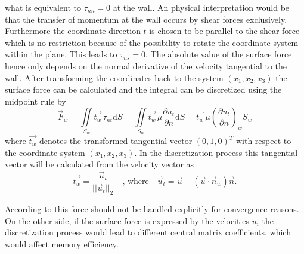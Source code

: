     what is equivalent to \( \tau_{nn} = 0\) at the wall. An physical interpretation would be that the transfer of momentum at the wall occurs by shear forces exclusively. Furthermore the coordinate direction \(t\) is chosen to be parallel to the shear force which is no restriction because of the possibility to rotate the coordinate system within the plane. This leads to \(\tau_{ns} = 0 \). The absolute value of the surface force hence only depends on the normal derivative of the velocity tangential to the wall. After transforming the coordinates back to the system \((x_1, x_2, x_3)\) the surface force can be calculated and the integral can be discretized using the midpoint rule by
    \begin{equation}
      \label{eq:wallforce}
      \vec{F}_w 
      =  
      \iint\limits_{S_w} \vec{t_w} \, \tau_{nt} \mathrm{d}S
      =
      \iint\limits_{S_w} \vec{t_w} \, \mu \frac{\partial u_t}{\partial n} \mathrm{d}S
      =
      \vec{t_w} \, \mu \left(\frac{\partial u_t}{\partial n}\right)_w S_w
    \end{equation}
    where \( \vec{t_w} \) denotes the transformed tangential vector \((0,1,0)^T\) with respect to the coordinate system \((x_1,x_2,x_3)\). In the discretization process this tangential vector will be calculated from the velocity vector as
    \begin{displaymath}
      \vec{t_w} = \frac{\vec{u}_t}{|| \vec{u}_t ||_2} \quad \text{, where} \quad \vec{u}_t = \vec{u} - \left( \vec{u} \cdot \vec{n}_w \right) \vec{n}.
    \end{displaymath}

    According to \cite{ferziger02} this force should not be handled explicitly for convergence reasons. On the other side, if the surface force is expressed by the velocities \(u_i\) the discretization process would lead to different central matrix coefficients, which would affect memory efficiency.

